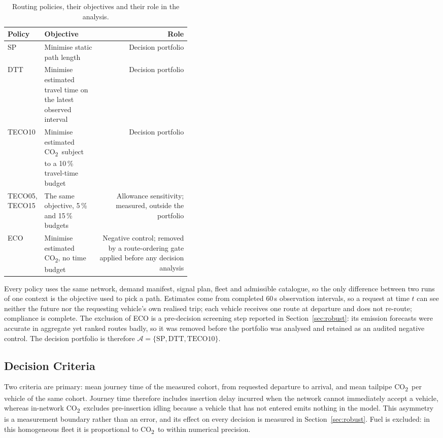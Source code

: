 \documentclass[runningheads]{llncs}
\newcommand{\CO}{CO\textsubscript{2}}
\begin{document}
\begin{table}[htb]
\centering\small
\caption{Routing policies, their objectives and their role in the analysis.}
\label{tab:policies}
\begin{tabularx}{\linewidth}{@{}>{\raggedright\arraybackslash}p{0.12\linewidth}
>{\raggedright\arraybackslash}p{0.30\linewidth}R@{}}
\toprule
Policy & Objective & Role\\
\midrule
SP & Minimise static path length & Decision portfolio\\
DTT & Minimise estimated travel time on the latest observed interval & Decision
portfolio\\
TECO10 & Minimise estimated \CO\ subject to a 10\,\% travel-time budget & Decision
portfolio\\
TECO05, TECO15 & The same objective, 5\,\% and 15\,\% budgets & Allowance sensitivity;
measured, outside the portfolio\\
ECO & Minimise estimated \CO, no time budget & Negative control; removed by a
route-ordering gate applied before any decision analysis\\
\bottomrule
\end{tabularx}
\end{table}

Every policy uses the same network, demand manifest, signal plan, fleet and admissible
catalogue, so the only difference between two runs of one context is the objective used to
pick a path. Estimates come from completed 60\,s observation intervals, so a request at
time $t$ can see neither the future nor the requesting vehicle's own realised trip; each
vehicle receives one route at departure and does not re-route; compliance is complete. The
exclusion of ECO is a pre-decision screening step reported in Section~\ref{sec:robust}:
its emission forecasts were accurate in aggregate yet ranked routes badly, so it was
removed before the portfolio was analysed and retained as an audited negative control. The
decision portfolio is therefore $\mathcal{A}=\{\text{SP},\text{DTT},\text{TECO10}\}$.

\subsection{Decision Criteria}

Two criteria are primary: mean journey time of the measured cohort, from requested
departure to arrival, and mean tailpipe \CO\ per vehicle of the same cohort. Journey time
therefore includes insertion delay incurred when the network cannot immediately accept a
vehicle, whereas in-network \CO\ excludes pre-insertion idling because a vehicle that has
not entered emits nothing in the model. This asymmetry is a measurement boundary rather
than an error, and its effect on every decision is measured in Section~\ref{sec:robust}.
Fuel is excluded: in this homogeneous fleet it is proportional to \CO\ to within numerical
precision.
\end{document}
